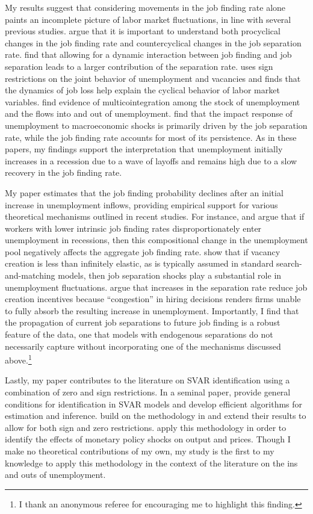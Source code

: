\documentclass[12pt]{article}
\begin{document}
My results suggest that considering movements in the job finding rate alone paints an incomplete picture of labor market fluctuations, in line with several previous studies. \cite{Elsby:2009aa} argue that it is important to understand both procyclical changes in the job finding rate and countercyclical changes in the job separation rate. \cite{Fujita:2009aa} find that allowing for a dynamic interaction between job finding and job separation leads to a larger contribution of the separation rate. \cite{Fujita:2011aa} uses sign restrictions on the joint behavior of unemployment and vacancies and finds that the dynamics of job loss help explain the cyclical behavior of labor market variables. \cite{Demiralp:2011aa} find evidence of multicointegration among the stock of unemployment and the flows into and out of unemployment. \cite{Canova:2013aa} find that the impact response of unemployment to macroeconomic shocks is primarily driven by the job separation rate, while the job finding rate accounts for most of its persistence. As in these papers, my findings support the interpretation that unemployment initially increases in a recession due to a wave of layoffs and remains high due to a slow recovery in the job finding rate. 

My paper estimates that the job finding probability declines after an initial increase in unemployment inflows, providing empirical support for various theoretical mechanisms outlined in recent studies. For instance, \cite{Ahn:2020aa} and \cite{Gregory:2025aa} argue that if workers with lower intrinsic job finding rates disproportionately enter unemployment in recessions, then this compositional change in the unemployment pool negatively affects the aggregate job finding rate. \cite{Coles:2018aa} show that if vacancy creation is less than infinitely elastic, as is typically assumed in standard search-and-matching models, then job separation shocks play a substantial role in unemployment fluctuations. \cite{Mercan:2024aa} argue that increases in the separation rate reduce job creation incentives because ``congestion'' in hiring decisions renders firms unable to fully absorb the resulting increase in unemployment. Importantly, I find that the propagation of current job separations to future job finding is a robust feature of the data, one that models with endogenous separations do not necessarily capture without incorporating one of the mechanisms discussed above.\footnote{I thank an anonymous referee for encouraging me to highlight this finding.}

Lastly, my paper contributes to the literature on SVAR identification using a combination of zero and sign restrictions. In a seminal paper, \cite{Rubio:2010aa} provide general conditions for identification in SVAR models and develop efficient algorithms for estimation and inference. \cite{Arias:2018aa} build on the methodology in \cite{Rubio:2010aa} and extend their results to allow for both sign and zero restrictions. \cite{Arias:2019aa} apply this methodology in order to identify the effects of monetary policy shocks on output and prices. Though I make no theoretical contributions of my own, my study is the first to my knowledge to apply this methodology in the context of the literature on the ins and outs of unemployment.
\end{document}
